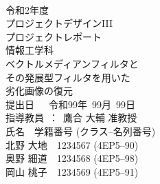 

\begin{titlepage}
 \begin{center}
  ~\\
  \vspace{1cm}
  {\Large 
  令和2年度\\
 プロジェクトデザインIII\\
  プロジェクトレポート\\
情報工学科\\}
  \vspace{1.3in}
  {\Huge \gt 
ベクトルメディアンフィルタと\\
その発展型フィルタを用いた\\
劣化画像の復元\\
  }
  \vspace{2in}
  {\LARGE 
  提出日~~~令和99年~99月~99日\\
  \vspace{0.4in}
  指導教員~：~鷹合 大輔 准教授\\
 \vspace{0.9in}
  氏名　学籍番号 (クラス--名列番号)\\
  \vspace{2mm}
  北野 大地　1234567 (4EP5--90)\\
  奥野 細道　1234568 (4EP5--98)\\
  岡山 桃子　1234569 (4EP5--91)\\
  }
 \end{center}
\end{titlepage}
